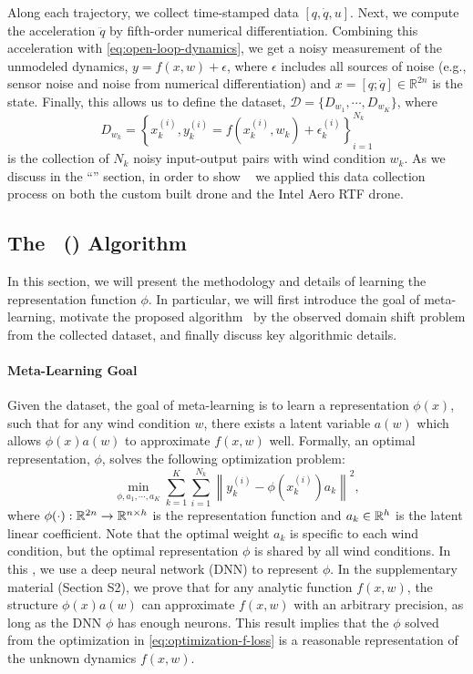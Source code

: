 Along each trajectory, we collect time-stamped data $[q,\dot{q},u]$.  Next, we compute the acceleration $\ddot{q}$ by fifth-order numerical differentiation.  Combining this acceleration with \cref{eq:open-loop-dynamics}, we get a noisy measurement of the unmodeled dynamics, $y = f(x, w) + \epsilon$, where $\epsilon$ includes all sources of noise (e.g., sensor noise and noise from numerical differentiation) and $x = [q; \dot{q}] \in \mathbb{R}^{2n}$ is the state. Finally, this allows us to define the dataset, $\mathcal{D}=\{D_{w_1},\cdots,D_{w_K}\}$, where
\begin{equation}
D_{w_k}=\left\{x_k^{(i)}, y_k^{(i)}=f(x_k^{(i)},w_k)+\epsilon_k^{(i)} \right\}_{i=1}^{N_k}   
\end{equation}
is the collection of $N_k$ noisy input-output pairs with wind condition $w_k$. As we discuss in the ``'' section, in order to show \DAML~
we applied this data collection process on both the custom built drone and the Intel Aero RTF drone.

\subsection*{The \LearningAlg~(\DAML) Algorithm}
In this section, we will present the methodology and details of learning the representation function $\phi$. In particular, we will first introduce the goal of meta-learning, motivate the proposed algorithm \DAML~by the observed domain shift problem from the collected dataset, and finally discuss key algorithmic details.

\paragraph{Meta-Learning Goal} Given the dataset, the goal of meta-learning is to learn a representation $\phi(x)$, such that for any wind condition $w$, there exists a latent variable $a(w)$ which allows $\phi(x)a(w)$ to approximate $f(x,w)$ well. Formally, an optimal representation, $\phi$, solves the following optimization problem:
\begin{equation}
\label{eq:optimization-f-loss}
    \min_{\phi,a_1,\cdots,a_K}\sum_{k=1}^K\sum_{i=1}^{N_k}
    \left\| y_k^{(i)} - \phi(x_k^{(i)})a_k \right\|^2,
\end{equation}
where $\phi(\cdot):\mathbb{R}^{2n}\rightarrow\mathbb{R}^{n\times h}$ is the representation function and $a_k\in\mathbb{R}^h$ is the latent linear coefficient. Note that the optimal weight $a_k$ is specific to each wind condition, but the optimal representation $\phi$ is shared by all wind conditions. In this , we use a deep neural network (DNN) to represent $\phi$. In the supplementary material (Section S2), we prove that for any analytic function $f(x,w)$, the structure $\phi(x)a(w)$ can approximate $f(x,w)$ with an arbitrary precision, as long as the DNN $\phi$ has enough neurons. This result implies that the $\phi$ solved from the optimization in \cref{eq:optimization-f-loss} is a reasonable representation of the unknown dynamics $f(x,w)$. 

